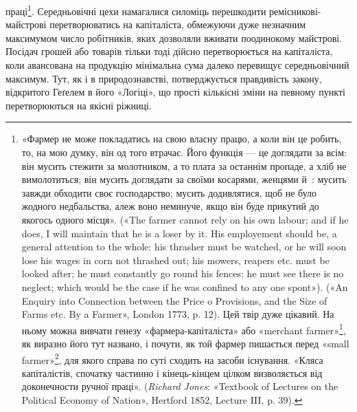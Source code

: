 праці\footnote{
«Фармер не може покладатись на свою власну працю, а коли
він це робить, то, на мою думку, він од того втрачає. Його функція — це
доглядати за всім: він мусить стежити за молотником, а то плата за останнім
пропаде, а хліб не вимолотиться; він мусить доглядати за своїми
косарями, женцями й~: мусить завжди обходити своє господарство;
мусить додивлятися, щоб не було жодного недбальства, алеж воно неминуче,
якщо він буде прикутий до якогось одного місця». («The farmer
cannot rely on his own labour; and if he does, I will maintain that he is
a loser by it. His employement should be, a general attention to the whole:
his thrasher must be watched, or he will soon lose his wages in corn not
thrashed out; his mowers, reapers etc. must be looked after; he must constantly
go round his fences: he must see there is no neglect; which would
be the case if he was confined to any one spont»). («An Enquiry into Connection
between the Price o Provisions, and the Size of Farms etc. By a
Farmer», London 1773, p. 12). Цей твір дуже цікавий. На ньому можна
вивчати генезу «фармера-капіталіста» або «merchant farmer»\footnote*{
— фармера-купця. \emph{Ред.}
}, як виразно
його тут названо, і почути, як той фармер пишається перед «small
farmer»\footnote*{
— дрібним фармером. \emph{Ред.}
}, для якого справа по суті сходить на засоби існування. «Кляса
капіталістів, спочатку частинно і кінець-кінцем цілком визволяється
від доконечности ручної праці». (\emph{Richard Jones}: «Textbook of Lectures on
the Political Economy of Nation», Hertford 1852, Lecture III, p. 39).
}. Середньовічні цехи намагалися силоміць перешкодити
ремісникові-майстрові перетворюватись на капіталіста, обмежуючи
дуже незначним максимумом число робітників, яких дозволяли
вживати поодинокому майстрові. Посідач грошей або товарів
тільки тоді дійсно перетворюється на капіталіста, коли авансована
на продукцію мінімальна сума далеко перевищує середньовічний
максимум. Тут, як і в природознавстві, потверджується
правдивість закону, відкритого Геґелем в його «Логіці»,
що прості кількісні зміни на певному пункті перетворюються
на якісні ріжниці.

